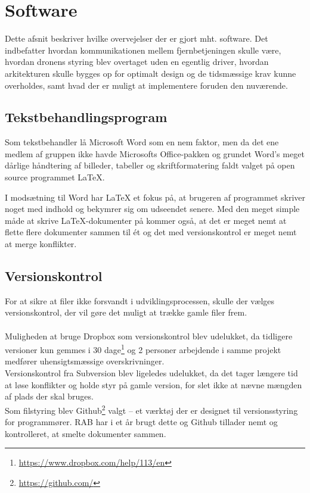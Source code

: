 \documentclass[Main]{subfiles}
\begin{document}
\chapter{Software}
Dette afsnit beskriver hvilke overvejelser der er gjort mht. software.
Det indbefatter hvordan kommunikationen mellem fjernbetjeningen skulle være, hvordan dronens styring blev overtaget uden en egentlig driver, hvordan arkitekturen skulle bygges op for optimalt design og de tidsmæssige krav kunne overholdes, samt hvad der er muligt at implementere foruden den nuværende.



\section{Tekstbehandlingsprogram}
Som tekstbehandler lå Microsoft Word som en nem faktor, men da det ene medlem af gruppen ikke havde Microsofts Office-pakken og grundet Word's meget dårlige håndtering af billeder, tabeller og skriftformatering faldt valget på open source programmet LaTeX.

I modsætning til Word har LaTeX et fokus på, at brugeren af programmet skriver noget med indhold og bekymrer sig om udseendet senere. 
Med den meget simple måde at skrive LaTeX-dokumenter på kommer også, at det er meget nemt at flette flere dokumenter sammen til ét og det med versionskontrol er meget nemt at merge konflikter.



\section{Versionskontrol}
For at sikre at filer ikke forsvandt i udviklingsprocessen, skulle der vælges  versionskontrol, der vil gøre det muligt at trække gamle filer frem.
\\
\\
Muligheden at bruge Dropbox som versionskontrol blev udelukket, da tidligere versioner kun gemmes i 30 dage\footnote{\url{https://www.dropbox.com/help/113/en}} og 2 personer arbejdende i samme projekt medfører uhensigtsmæssige overskrivninger.
\\
Versionskontrol fra Subversion blev ligeledes udelukket, da det tager længere tid at løse konflikter og holde styr på gamle version, for slet ikke at nævne mængden af plads der skal bruges.
\\
Som filstyring blev Github\footnote{\url{https://github.com/}} valgt -- et værktøj der er designet til versionsstyring for programmører. RAB har i et år brugt dette og Github tillader nemt og kontrolleret, at smelte dokumenter sammen.
\end{document}
